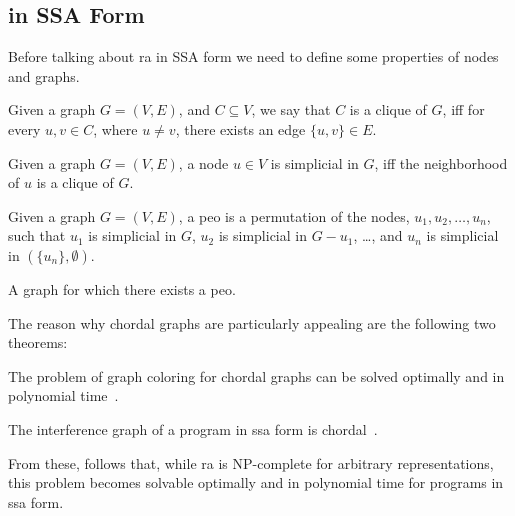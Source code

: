 \subsection{ in SSA Form}
\label{subsec:ssara}

Before talking about \gls{ra} in SSA form we need to define some properties of nodes and graphs.

\begin{definition}[Clique]\label{def:clique}
  Given a graph $G = (V, E)$, and $C \subseteq V$, we say that $C$ is a clique of $G$, iff for every $u, v \in C$, where $u \neq v$, there exists an edge $\{ u, v \} \in E$.
\end{definition}

\begin{definition}\label{def:simplicial}
  Given a graph $G = (V, E)$, a node $u \in V$ is simplicial in $G$, iff the neighborhood of $u$ is a clique of $G$.
\end{definition}

\begin{definition}\label{def:peo}
  Given a graph $G = (V, E)$, a \gls{peo} is a permutation of the nodes, $u_1, u_2, \dots, u_n$, such that $u_1$ is simplicial in $G$, $u_2$ is simplicial in $G - u_1$, \dots, and $u_n$ is simplicial in $(\{ u_n \}, \emptyset)$.
\end{definition}

\begin{definition}\label{def:chordal1}
  A graph for which there exists a \gls{peo}.
\end{definition}

The reason why chordal graphs are particularly appealing are the following two theorems:

\begin{theorem}
  The problem of graph coloring for chordal graphs can be solved optimally and in polynomial time~\cite{golumbic2004algorithmic}.
\end{theorem}

\begin{theorem}
  The interference graph of a program in \gls{ssa} form is chordal~\cite{HGG:2006:RA-SSA}.
\end{theorem}

From these, follows that, while \gls{ra} is NP-complete for arbitrary representations, this problem becomes solvable optimally and in polynomial time for programs in \gls{ssa} form.

